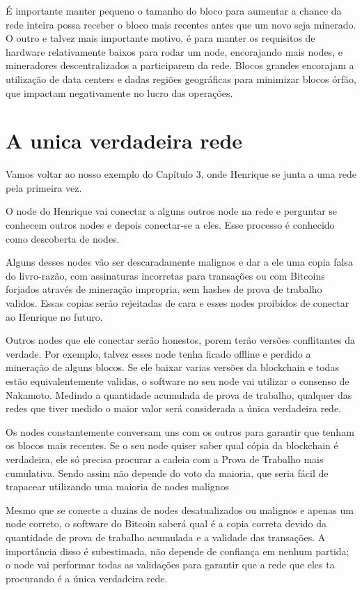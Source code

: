 É importante manter pequeno o tamanho do bloco para aumentar a chance da rede inteira possa receber o bloco mais recentes antes que um novo seja minerado.
O outro e talvez mais importante motivo, é para manter os requisitos de hardware relativamente baixos para rodar um node, encorajando mais nodes, e mineradores descentralizados a participarem da rede.
Blocos grandes encorajam a utilização de data centers e dadas regiões geográficas para minimizar blocos órfão, que impactam negativamente no lucro das operações.

\section*{A unica verdadeira rede} %


Vamos voltar ao nosso exemplo do Capítulo 3, onde Henrique se junta a uma rede pela primeira vez.

O node do Henrique vai conectar a alguns outros node na rede e perguntar se conhecem outros nodes e depois conectar-se a eles. Esse processo é conhecido como descoberta de nodes.

Alguns desses nodes vão ser descaradamente malignos e dar a ele uma copia falsa do livro-razão, com assinaturas incorretas para transações ou com Bitcoins forjados através de mineração impropria, sem hashes de prova de trabalho validos. Essas copias serão rejeitadas de cara e esses nodes proibidos de conectar ao Henrique no futuro.

Outros nodes que ele conectar serão honestos, porem terão versões conflitantes da verdade. Por exemplo, talvez esses node tenha ficado offline e perdido a mineração de alguns blocos. Se ele baixar varias versões da blockchain e todas estão equivalentemente validas, o software no seu node vai utilizar o consenso de Nakamoto. Medindo a quantidade acumulada de prova de trabalho, qualquer das redes que tiver medido o maior valor  será  considerada a única verdadeira rede.

Os nodes constantemente conversam uns com os outros para garantir que tenham os blocos mais recentes.
Se o seu node quiser saber qual cópia da blockchain é verdadeira, ele só precisa procurar a cadeia com a Prova de Trabalho mais cumulativa.
Sendo assim \TraducaoNomeH{} não depende do voto da maioria, que seria fácil de trapacear utilizando uma maioria de nodes malignos

Mesmo que \TraducaoNomeH{} se conecte a duzias de nodes desatualizados ou malignos e apenas um node correto, o software do Bitcoin saberá qual é a copia correta devido  da quantidade de prova de trabalho acumulada e a validade das transações. A importância disso é subestimada, \TraducaoNomeH{} não depende de confiança em nenhum partida; o node vai performar todas as validações para garantir que a rede que eles ta procurando é a única verdadeira rede.

